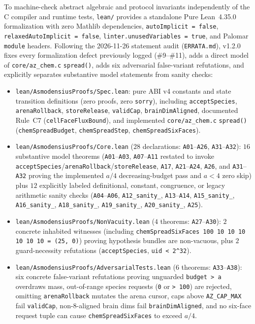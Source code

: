 \documentclass[11pt,reqno]{amsart}
\newcommand{\code}[1]{\texttt{\footnotesize #1}}
\newcommand{\us}{\_\allowbreak}
\newcommand{\slsh}{/\allowbreak}
\begin{document}
To machine-check abstract algebraic and protocol invariants independently of the C compiler and runtime tests, \code{lean/} provides a standalone Pure Lean~4.35.0~\cite{moura2021lean4} formalization with zero Mathlib dependencies, \code{autoImplicit = false}, \code{relaxedAutoImplicit = false}, \code{linter.unusedVariables = true}, and Palomar \code{module} headers. Following the 2026-11-26 statement audit (\code{ERRATA.md}), v1.2.0 fixes every formalization defect previously logged (\#9--\#11), adds a direct model of \code{core\slsh az\us chem.c} \code{spread()}, adds six adversarial false-variant refutations, and explicitly separates substantive model statements from sanity checks:
\begin{itemize}[leftmargin=1.8em,itemsep=2pt]
  \item \code{lean\slsh AsmodensiusProofs\slsh Spec.lean}: pure ABI v4 constants and state transition definitions (zero proofs, zero \code{sorry}), including \code{acceptSpecies}, \code{arenaRollback}, \code{storeRelease}, \code{validCap}, \code{brainDimAligned}, documented Rule~C7 (\code{cell\allowbreak Face\allowbreak Flux\allowbreak Bound}), and implemented \code{core\slsh az\us chem.c} \code{spread()} (\code{chem\allowbreak Spread\allowbreak Budget}, \code{chem\allowbreak Spread\allowbreak Step}, \code{chem\allowbreak Spread\allowbreak Six\allowbreak Faces}).
  \item \code{lean\slsh AsmodensiusProofs\slsh Core.lean} ($28$ declarations: \code{A01}--\code{A26}, \code{A31}--\code{A32}): $16$ substantive model theorems (\code{A01}--\code{A03}, \code{A07}--\code{A11} restated to invoke \code{acceptSpecies}/\code{arenaRollback}/\code{storeRelease}, \code{A17}, \code{A21}--\code{A24}, \code{A26}, and \code{A31}--\code{A32} proving the implemented $a/4$ decreasing-budget pass and $a<4$ zero skip) plus $12$ explicitly labeled definitional, constant, congruence, or legacy arithmetic sanity checks (\code{A04}--\code{A06}, \code{A12\us sanity\us*}, \code{A13}--\code{A14}, \code{A15\us sanity\us*}, \code{A16\us sanity\us*}, \code{A18\us sanity\us*}, \code{A19\us sanity\us*}, \code{A20\us sanity\us*}, \code{A25}).
  \item \code{lean\slsh AsmodensiusProofs\slsh NonVacuity.lean} ($4$ theorems: \code{A27}--\code{A30}): $2$ concrete inhabited witnesses (including \code{chemSpreadSixFaces 100 10 10 10 10 10 10 = (25, 0)}) proving hypothesis bundles are non-vacuous, plus $2$ guard-necessity refutations (\code{acceptSpecies}, \code{uid < 2\^{}32}).
  \item \code{lean\slsh AsmodensiusProofs\slsh AdversarialTests.lean} ($6$ theorems: \code{A33}--\code{A38}): six concrete false-variant refutations proving unguarded \code{budget > a} overdraws mass, out-of-range species requests (\code{0} or \code{> 100}) are rejected, omitting \code{arenaRollback} mutates the arena cursor, caps above \code{AZ\us CAP\us MAX} fail \code{validCap}, non-8-aligned brain dims fail \code{brainDimAligned}, and no six-face request tuple can cause \code{chemSpreadSixFaces} to exceed $a / 4$.

\end{itemize}
\end{document}
